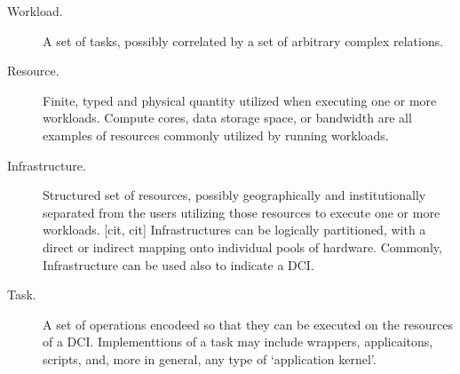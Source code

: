 \documentclass{sig-alternate}
\begin{document}
\begin{description}


\item[Workload.] A set of tasks, possibly correlated by a set of
arbitrary complex relations.

\item[Resource.] Finite, typed and physical quantity utilized when
executing one or more workloads. Compute cores, data storage space, or
bandwidth are all examples of resources commonly utilized by running
workloads.

\item[Infrastructure.] Structured set of resources, possibly
geographically and institutionally separated from the users   utilizing
those resources to execute one or more workloads. [cit, cit]
Infrastructures can be logically partitioned, with a direct or indirect
mapping onto individual pools of hardware. Commonly, Infrastructure can
be used also to indicate a DCI.


\item[Task.] A set of operations encodeed so that they can be executed
on the resources of a DCI. Implementtions of a task may include
wrappers, applicaitons, scripts, and, more in general, any type of
`application kernel'.


\end{description}
\end{document}
